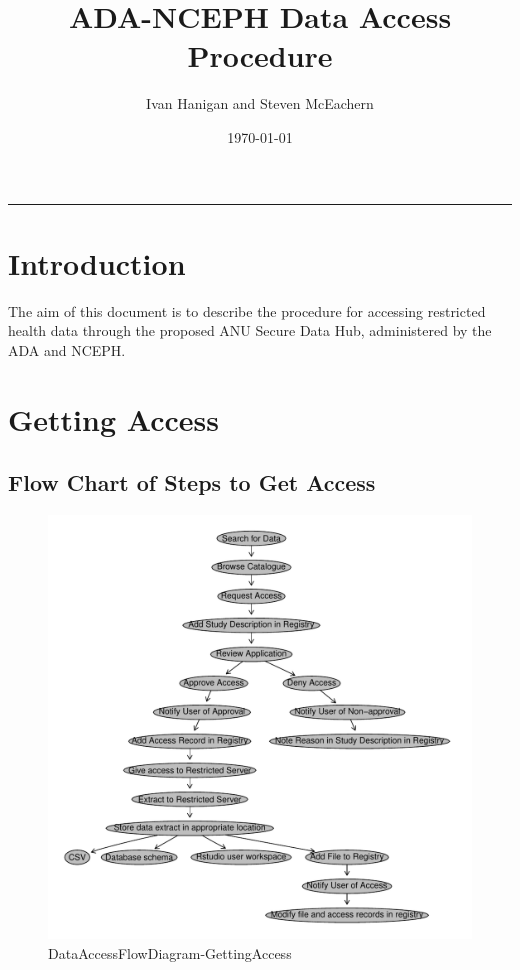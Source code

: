\documentclass[a4paper]{article}
\title{ADA-NCEPH Data Access Procedure}
\author{Ivan Hanigan and Steven McEachern}
\date{\today}
\begin{document}
\maketitle

\tableofcontents
\hrule
\clearpage
\section{Introduction}
\label{sec-1}

The aim of this document is to describe the procedure for accessing restricted health data through the proposed ANU Secure Data Hub, administered by the ADA and NCEPH.
\section{Getting Access}
\label{sec-2}

  
\subsection{Flow Chart of Steps to Get Access}
\label{sec-2-1}

\begin{figure}[!h]
\centering
\includegraphics[width=\textwidth]{DataAccessFlowDiagram-GettingAccess.pdf}
\caption{DataAccessFlowDiagram-GettingAccess}
\label{fig:DataAccessFlowDiagram-GettingAccess}
\end{figure}
\clearpage
\end{document}
